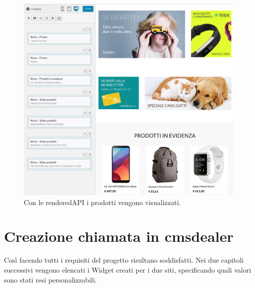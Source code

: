 \begin{figure}
  \includegraphics[width=\textwidth]{figure/livedit.png}
  \caption{Con le renderedAPI i prodotti vengono visualizzati.}
  \label{fig:kspec}
\end{figure}

\newpage
\section{Creazione chiamata in cmsdealer}

Così facendo tutti i requisiti del progetto risultano soddisfatti.
Nei due capitoli successivi vengono elencati i Widget creati per i due siti, specificando
quali valori sono stati resi personalizzabili.
